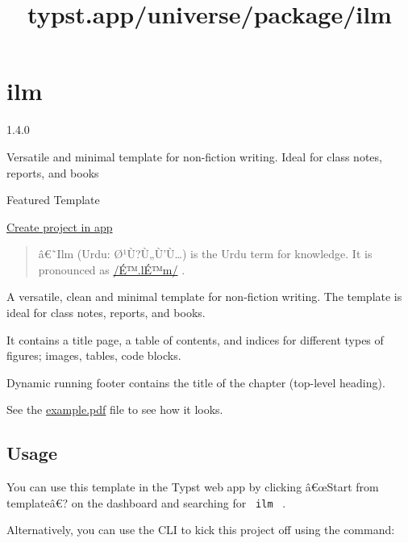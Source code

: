 \title{typst.app/universe/package/ilm}

\label{banner}
\label{template-thumbnail}

\section{ilm}\label{ilm}

{ 1.4.0 }

Versatile and minimal template for non-fiction writing. Ideal for class
notes, reports, and books

{ } Featured Template

\href{/app?template=ilm&version=1.4.0}{Create project in app}

\label{readme}
\begin{quote}
â€˜Ilm (Urdu: Ø¹Ù?Ù„Ù'Ù\ldots) is the Urdu term for knowledge. It is
pronounced as
\href{https://en.wiktionary.org/wiki/\%D8\%B9\%D9\%84\%D9\%85\#Urdu}{/É™.lÉ™m/}
.
\end{quote}

A versatile, clean and minimal template for non-fiction writing. The
template is ideal for class notes, reports, and books.

It contains a title page, a table of contents, and indices for different
types of figures; images, tables, code blocks.

Dynamic running footer contains the title of the chapter (top-level
heading).

See the
\href{https://github.com/talal/ilm/blob/main/example.pdf}{example.pdf}
file to see how it looks.

\subsection{Usage}\label{usage}

You can use this template in the Typst web app by clicking â€œStart from
templateâ€? on the dashboard and searching for \texttt{\ ilm\ } .

Alternatively, you can use the CLI to kick this project off using the
command:

\begin{Shaded}
\begin{Highlighting}[]
\end{Highlighting}
\end{Shaded}


